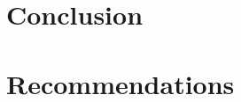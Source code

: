 

\section{Conclusion}
\label{sec:conclusion}

\section{Recommendations}
\label{sec:recommendations}
